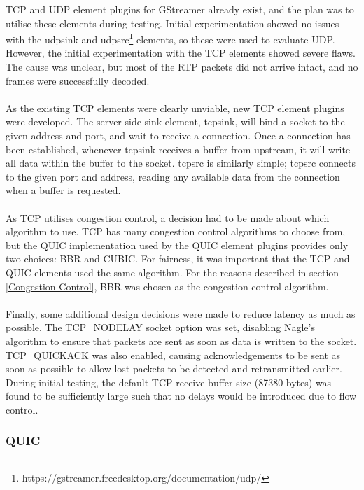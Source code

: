 \documentclass{mpaper}
\begin{document}
\noindent TCP and UDP element plugins for GStreamer already exist, and the plan was to utilise these elements during testing.  Initial experimentation showed no issues with the udpsink and udpsrc\footnote{https://gstreamer.freedesktop.org/documentation/udp/} elements, so these were used to evaluate UDP. However, the initial experimentation with the TCP elements showed severe flaws. The cause was unclear, but most of the RTP packets did not arrive intact, and no frames were successfully decoded.
\\\\
As the existing TCP elements were clearly unviable, new TCP element plugins were developed. The server-side sink element, tcpsink, will bind a socket to the given address and port, and wait to receive a connection. Once a connection has been established, whenever tcpsink receives a buffer from upstream, it will write all data within the buffer to the socket. tcpsrc is similarly simple; tcpsrc connects to the given port and address, reading any available data from the connection when a buffer is requested.
\\\\
As TCP utilises congestion control, a decision had to be made about which algorithm to use. TCP has many congestion control algorithms to choose from, but the QUIC implementation used by the QUIC element plugins provides only two choices: BBR and CUBIC. For fairness, it was important that the TCP and QUIC elements used the same algorithm. For the reasons described in section \ref{Congestion Control}, BBR was chosen as the congestion control algorithm.
\\\\
Finally, some additional design decisions were made to reduce latency as much as possible. The TCP\_NODELAY socket option was set, disabling Nagle's algorithm to ensure that packets are sent as soon as data is written to the socket. TCP\_QUICKACK was also enabled, causing acknowledgements to be sent as soon as possible to allow lost packets to be detected and retransmitted earlier. During initial testing, the default TCP receive buffer size (87380 bytes) was found to be sufficiently large such that no delays would be introduced due to flow control.

\subsubsection{QUIC} \label{QUIC}
\end{document}
